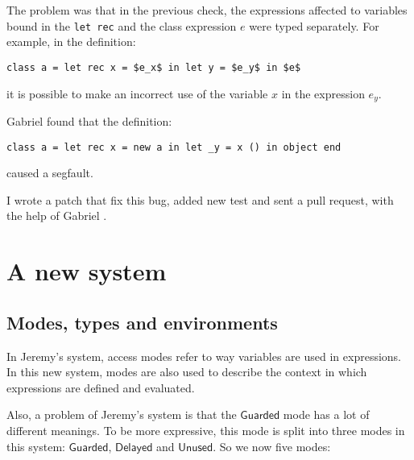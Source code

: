 \documentclass{article}
\newcommand{\Guarded}{\mathsf{Guarded}}
\newcommand{\Delayed}{\mathsf{Delayed}}
\newcommand{\Unused}{\mathsf{Unused}}
\begin{document}
%

The problem was that in the previous check, the expressions affected to
variables bound in the \lstinline|let rec| and the class expression $e$ were
typed separately. For example, in the definition:
\begin{lstlisting}[mathescape=true]
class a = let rec x = $e_x$ in let y = $e_y$ in $e$
\end{lstlisting}
it is possible to make an incorrect use of the variable $x$ in the expression
$e_y$.

Gabriel found that the definition:
\begin{lstlisting}
class a = let rec x = new a in let _y = x () in object end
\end{lstlisting}
caused a segfault.

I wrote a patch that fix this bug, added new test and sent a pull request,
with the help of Gabriel \cite{PullRequest}.


\section{A new system}


\subsection{Modes, types and environments}
In Jeremy's system, access modes refer to way variables are used in expressions.
In this new system, modes are also used to describe the context in which
expressions are defined and evaluated.

Also, a problem of Jeremy's system is that the $\Guarded$ mode has a lot of
different meanings. To be more expressive, this mode is split into three modes
in this system: $\Guarded$, $\Delayed$ and $\Unused$. So we now five modes:
\end{document}
